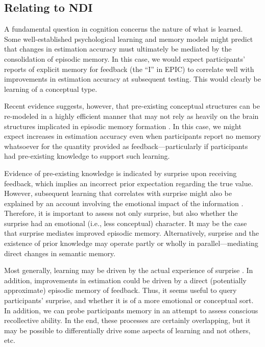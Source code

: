 
\subsection{Relating to NDI}

A fundamental question in cognition concerns the nature of what is learned. Some
well-established psychological learning and memory models
\cite{nadel_memory_1997} might predict that changes in estimation accuracy must
ultimately be mediated by the consolidation of episodic memory. In this case, we
would expect participants' reports of explicit memory for feedback (the ``I'' in
EPIC) to correlate well with improvements in estimation accuracy at subsequent
testing.  This would clearly be learning of a conceptual type.

Recent evidence suggests, however, that pre-existing conceptual structures can
be re-modeled in a highly efficient manner that may not rely as heavily on the
brain structures implicated in episodic memory formation
\cite{tse_schemas_2007,clark_assembling_2003}. In this case, we might expect
increases in estimation accuracy even when participants report no memory
whatsoever for the quantity provided as feedback---particularly if participants
had pre-existing knowledge to support such learning.

Evidence of pre-existing knowledge is indicated by surprise upon receiving
feedback, which implies an incorrect prior expectation regarding the true value.
However, subsequent learning that correlates with surprise might also be
explained by an account involving the emotional impact of the information
\cite{munnich_surprise_2007,thagard_hot_2006}.  Therefore, it is important to
assess not only surprise, but also whether the surprise had an emotional (i.e.,
less conceptual) character. It may be the case that surprise mediates improved
episodic memory. Alternatively, surprise and the existence of prior knowledge
may operate partly or wholly in parallel---mediating direct changes in semantic
memory.

Most generally, learning may be driven by the actual experience of surprise
\cite[e.g.,][]{munnich_longevities_2005}.  In addition, improvements in estimation could be
driven by a direct (potentially approximate) episodic memory of feedback. Thus,
it seems useful to query participants' surprise, and whether it is of a more
emotional or conceptual sort. In addition, we can probe participants memory in
an attempt to assess conscious recollective ability. In the end, these processes
are certainly overlapping, but it may be possible to differentially drive some
aspects of learning and not others, etc.

